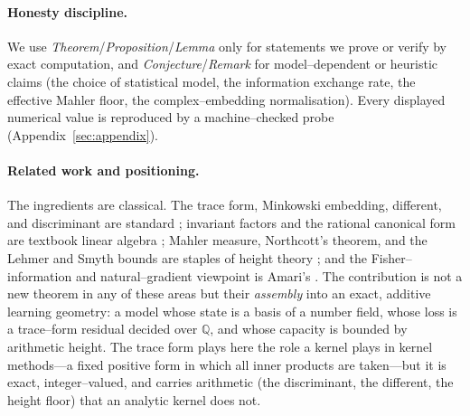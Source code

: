 \documentclass[11pt]{article}
\theoremstyle{plain}
\theoremstyle{definition}
\theoremstyle{remark}
\newcommand{\Q}{\mathbb{Q}}
\begin{document}
\paragraph{Honesty discipline.} We use \emph{Theorem}/\emph{Proposition}/\emph{Lemma} only for statements we
prove or verify by exact computation, and \emph{Conjecture}/\emph{Remark} for model--dependent or heuristic
claims (the choice of statistical model, the information exchange rate, the effective Mahler floor, the
complex--embedding normalisation). Every displayed numerical value is reproduced by a machine--checked probe
(Appendix~\ref{sec:appendix}).

\paragraph{Related work and positioning.} The ingredients are classical. The trace form, Minkowski embedding,
different, and discriminant are standard \cite{Neukirch,Marcus}; invariant factors and the rational canonical
form are textbook linear algebra \cite{DummitFoote}; Mahler measure, Northcott's theorem, and the Lehmer and
Smyth bounds are staples of height theory \cite{Mahler,Northcott,Lehmer,Smyth,BombieriGubler}; and the
Fisher--information and natural--gradient viewpoint is Amari's \cite{Amari,AmariNagaoka}. The contribution is
not a new theorem in any of these areas but their \emph{assembly} into an exact, additive learning geometry:
a model whose state is a basis of a number field, whose loss is a trace--form residual decided over $\Q$, and
whose capacity is bounded by arithmetic height. The trace form plays here the role a kernel plays in kernel
methods---a fixed positive form in which all inner products are taken---but it is exact, integer--valued, and
carries arithmetic (the discriminant, the different, the height floor) that an analytic kernel does not.
\end{document}

